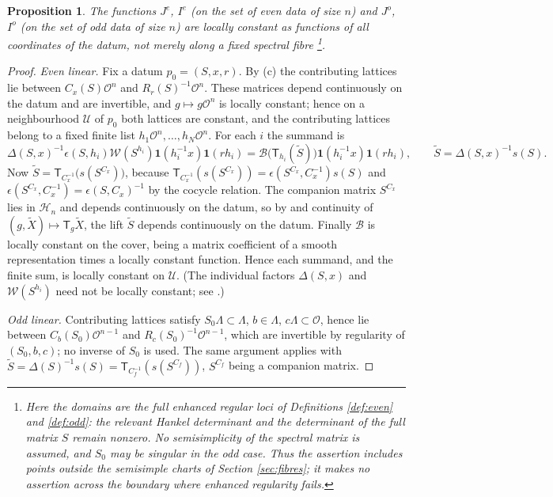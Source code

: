 \documentclass[11pt,oneside,notitlepage]{book}
\numberwithin{equation}{section}
\theoremstyle{plain}
\newtheorem{proposition}[theorem]{Proposition}
\theoremstyle{definition}
\newcommand{\cO}{\mathcal{O}}
\newcommand{\cW}{\mathcal{W}}
\newcommand{\cB}{\mathcal{B}}
\newcommand{\one}{\mathbf{1}}
\newcommand{\T}{\mathsf{T}}
\begin{document}
\begin{proposition}\label{prop:local-constancy}
The functions $J^e$, $I^e$ (on the set of even data of size $n$) and $J^o$, $I^o$ (on the set of odd data of size $n$) are locally constant as functions of all coordinates of the datum, not merely along a fixed spectral fibre \footnote{Here the domains are the full enhanced regular loci of Definitions \ref{def:even} and \ref{def:odd}: the relevant Hankel determinant and the determinant of the full matrix $S$ remain nonzero.	No semisimplicity of the spectral matrix is assumed, and $S_0$ may be singular in the odd case. Thus the assertion	includes points outside the semisimple charts of Section \ref{sec:fibres};	it makes no assertion across the boundary where enhanced	regularity fails.}.
\end{proposition}
\begin{proof}
\emph{Even linear.} Fix a datum $p_0=(S,x,r)$. By (c) the contributing lattices lie between $C_x(S)\cO^n$ and $R_r(S)^{-1}\cO^n$. These matrices depend continuously on the datum and are invertible, and $g\mapsto g\cO^n$ is locally constant; hence on a neighbourhood $\mathcal U$ of $p_0$ both lattices are constant, and the contributing lattices belong to a fixed finite list $h_1\cO^n,\dots,h_N\cO^n$. For each $i$ the summand is
\[\Delta(S,x)^{-1}\epsilon(S,h_i)\cW(S^{h_i})\one(h_i^{-1}x)\one(rh_i)=\cB\bigl(\T_{h_i}(\tilde S)\bigr)\one(h_i^{-1}x)\one(rh_i),\qquad\tilde S=\Delta(S,x)^{-1}s(S).\]
Now $\tilde S=\T_{C_x^{-1}}\bigl(s(S^{C_x})\bigr)$, because $\T_{C_x^{-1}}(s(S^{C_x}))=\epsilon(S^{C_x},C_x^{-1})s(S)$ and $\epsilon(S^{C_x},C_x^{-1})=\epsilon(S,C_x)^{-1}$ by the cocycle relation. The companion matrix $S^{C_x}$ lies in $\mathcal H_n$ and depends continuously on the datum, so by  and continuity of $(g,\tilde X)\mapsto\T_g\tilde X$, the lift $\tilde S$ depends continuously on the datum. Finally $\cB$ is locally constant on the cover, being a matrix coefficient of a smooth representation times a locally constant function. Hence each summand, and the finite sum, is locally constant on $\mathcal U$. (The individual factors $\Delta(S,x)$ and $\cW(S^{h_i})$ need not be locally constant; see .)

\emph{Odd linear.} Contributing lattices satisfy $S_0\Lambda\subset\Lambda$, $b\in\Lambda$, $c\Lambda\subset\cO$, hence lie between $C_b(S_0)\cO^{n-1}$ and $R_c(S_0)^{-1}\cO^{n-1}$, which are invertible by regularity of $(S_0,b,c)$; no inverse of $S_0$ is used. The same argument applies with $\tilde S=\Delta(S)^{-1}s(S)=\T_{C_f^{-1}}(s(S^{C_f}))$, $S^{C_f}$ being a companion matrix.


\end{proof}
\end{document}
